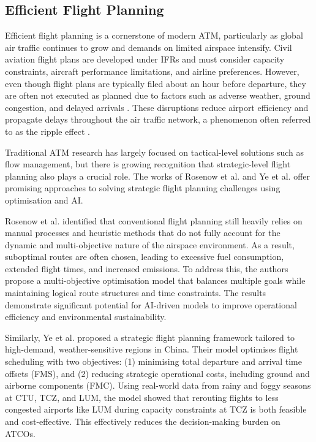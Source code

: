 \subsection{Efficient Flight Planning}

Efficient flight planning is a cornerstone of modern \gls{ATM}, particularly as global air traffic continues to grow and demands on limited airspace intensify.
Civil aviation flight plans are developed under \glspl{IFR} and must consider capacity constraints, aircraft performance limitations, and airline preferences.
However, even though flight plans are typically filed about an hour before departure, they are often not executed as planned due to factors such as adverse weather, ground congestion, and delayed arrivals  \cite{Rosenow_2021}.
These disruptions reduce airport efficiency and propagate delays throughout the air traffic network, a phenomenon often referred to as the ripple effect \cite{Ye_2024}.

Traditional \gls{ATM} research has largely focused on tactical-level solutions such as flow management, but there is growing recognition that strategic-level flight planning also plays a crucial role.
The works of Rosenow et al. \cite{Rosenow_2021} and Ye et al. \cite{Ye_2024} offer promising approaches to solving strategic flight planning challenges using optimisation and \gls{AI}.

Rosenow et al. \cite{Rosenow_2021} identified that conventional flight planning still heavily relies on manual processes and heuristic methods that do not fully account for the dynamic and multi-objective nature of the airspace environment.
As a result, suboptimal routes are often chosen, leading to excessive fuel consumption, extended flight times, and increased emissions.
To address this, the authors propose a multi-objective optimisation model that balances multiple goals while maintaining logical route structures and time constraints.
The results demonstrate significant potential for \gls{AI}-driven models to improve operational efficiency and environmental sustainability.

Similarly, Ye et al. \cite{Ye_2024} proposed a strategic flight planning framework tailored to high-demand, weather-sensitive regions in China.
Their model optimises flight scheduling with two objectives: (1) minimising total departure and arrival time offsets (\gls{FMS}), and (2) reducing strategic operational costs, including ground and airborne components (\gls{FMC}).
Using real-world data from rainy and foggy seasons at \gls{CTU}, \gls{TCZ}, and \gls{LUM}, the model showed that rerouting flights to less congested airports like \gls{LUM} during capacity constraints at \gls{TCZ} is both feasible and cost-effective.
This effectively reduces the decision-making burden on \glspl{ATCO}.

